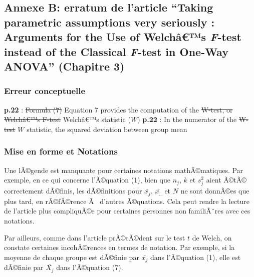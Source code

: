 \begin{appendix}
{\subsection{\texorpdfstring{Annexe B: erratum de l'article ``Taking
parametric assumptions very seriously : Arguments for the Use of
Welchâ€™s \emph{F}-test instead of the Classical \emph{F}-test in
One-Way ANOVA'' (Chapitre
3)}{Annexe B: erratum de l'article ``Taking parametric assumptions very seriously : Arguments for the Use of Welchâ€™s F-test instead of the Classical F-test in One-Way ANOVA'' (Chapitre 3)}}\label{annexe-b-erratum-de-larticle-taking-parametric-assumptions-very-seriously-arguments-for-the-use-of-welchuxe2s-f-test-instead-of-the-classical-f-test-in-one-way-anova-chapitre-3}}

\hypertarget{erreur-conceptuelle}{%
\subsubsection{Erreur conceptuelle}\label{erreur-conceptuelle}}

\textbf{p.22} : \sout{Formula (7)} \color{blue}Equation 7 \color{black}
provides the computation of the \sout{W-test, or Welchâ€™s F-test}
\color{blue}Welchâ€™s statistic (\(W\)) \color{black} \textbf{p.22} : In
the numerator of the \sout{W-test} \color{blue}\(W\)
statistic,\color{black} the squared deviation between group mean

\hypertarget{mise-en-forme-et-notations-1}{%
\subsubsection{Mise en forme et
Notations}\label{mise-en-forme-et-notations-1}}

Une lÃ©gende est manquante pour certaines notations mathÃ©matiques. Par
exemple, en ce qui concerne l'Ã©quation (1), bien que \(n_j\), \(k\) et
\(s^2_j\) aient Ã©tÃ© correctement dÃ©finis, les dÃ©finitions pour
\(\bar{x_j}\), \(\bar{x_{..}}\) et \(N\) ne sont donnÃ©es que plus tard,
en rÃ©fÃ©rence Ã~ d'autres Ã©quations. Cela peut rendre la lecture de
l'article plus compliquÃ©e pour certaines personnes non familiÃ¨res avec
ces notations.

Par ailleurs, comme dans l'article prÃ©cÃ©dent sur le test \(t\) de
Welch, on constate certaines incohÃ©rences en termes de notation. Par
exemple, si la moyenne de chaque groupe est dÃ©finie par \(\bar{x_j}\)
dans l'Ã©quation (1), elle est dÃ©finie par \(\bar{X_j}\) dans
l'Ã©quation (7).


\end{appendix}
